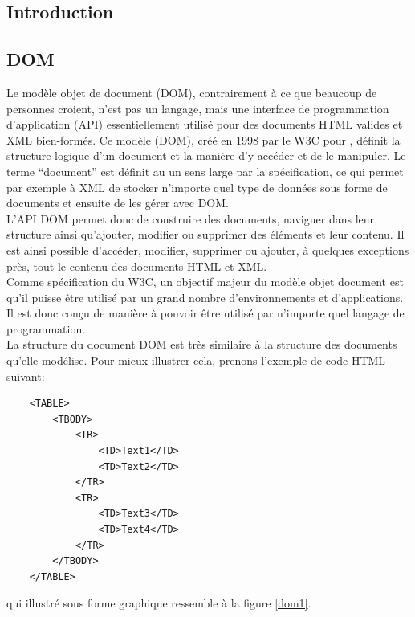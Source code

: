 \documentclass[10pt,a4paper,titlepage]{article}
\begin{document}
\subsection{Introduction}

\subsection{DOM} %
Le modèle objet de document (DOM), contrairement à ce que beaucoup de personnes croient, n'est pas un langage, mais une interface de programmation d'application (API) essentiellement utilisé pour des documents HTML valides et XML bien-formés. Ce modèle (DOM), créé en 1998 par le W3C pour , définit la structure logique d'un document et la manière d'y accéder et de le manipuler. Le terme “document” est définit au un sens large par la spécification, ce qui permet par exemple à XML de stocker n'importe quel type de données sous forme de documents et ensuite de les gérer avec DOM.\\

L'API DOM permet donc de construire des documents, naviguer dans leur structure ainsi qu'ajouter, modifier ou supprimer des éléments et leur contenu. Il est ainsi possible d'accéder, modifier, supprimer ou ajouter, à quelques exceptions près, tout le contenu des documents HTML et XML.\\

Comme spécification du W3C, un objectif majeur du modèle objet document est qu'il puisse être utilisé par un grand nombre d'environnements et d'applications. Il est donc conçu de manière à pouvoir être utilisé par n'importe quel langage de programmation.\\

La structure du document DOM est très similaire à la structure des documents qu'elle modélise. Pour mieux illustrer cela, prenons l'exemple de code HTML suivant:

\begin{lstlisting}
	<TABLE>
		<TBODY> 
			<TR> 
				<TD>Text1</TD>
				<TD>Text2</TD> 
			</TR> 
			<TR>
				<TD>Text3</TD>        
				<TD>Text4</TD> 
			</TR> 
		</TBODY>
	</TABLE>
\end{lstlisting}

qui illustré sous forme graphique ressemble à la figure \ref{dom1}.
\end{document}
